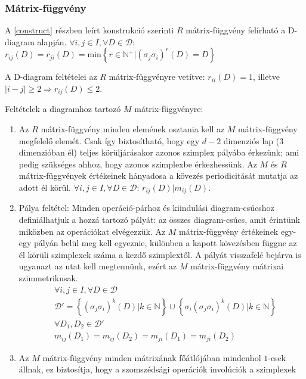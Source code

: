 \documentclass[12pt,magyar,a4paper]{article}
\begin{document}
\subsubsection{Mátrix-függvény}
A \ref{construct} részben leírt konstrukció szerinti $R$ mátrix-függvény
felírható a D-diagram alapján. $\forall i,j\in I, \forall D\in \mathcal{D}$:
$r_{ij}(D)=r_{ji}(D)=\mathrm{min}\left\{r\in
\mathbb{N}^+|(\sigma_j\sigma_i)^r(D)=D\right\}$

A D-diagram feltételei az $R$ mátrix-függvényre vetítve: $r_{ii}(D)=1$,
illetve $|i-j|\geq 2 \Rightarrow r_{ij}(D)\leq2$.

Feltételek a diagramhoz tartozó $M$ mátrix-függvényre:
\begin{enumerate}
  \item Az $R$ mátrix-függvény minden elemének osztania kell az $M$
    mátrix-függvény megfelelő elemét. Csak így biztosítható, hogy egy $d-2$
    dimenziós lap ($3$ dimenzióban él) teljes körüljárásakor azonos szimplex
    pályába érkezünk; ami pedig szükséges ahhoz, hogy azonos szimplexbe
    érkezhessünk. Az $M$ és $R$ mátrix-függvények értékeinek hányadosa a kövezés
    periodicitását mutatja az adott él körül. $\forall i,j\in I, \forall D\in
    \mathcal{D}$: $r_{ij}(D)|m_{ij}(D)$.
  \item Pálya feltétel: Minden operáció-párhoz és kiindulási diagram-csúcshoz
    definiálhatjuk a hozzá tartozó pályát: az összes diagram-csúcs, amit
    érintünk miközben az operációkat elvégezzük. Az $M$ mátrix-függvény
    értékeinek egy-egy pályán belül meg kell egyeznie, különben a kapott
    kövezésben függne az él körüli szimplexek száma a kezdő szimplextől. A
    pályát visszafelé bejárva is ugyanazt az utat kell megtennünk, ezért az $M$
    mátrix-függvény mátrixai szimmetrikusak.
    \begin{align*}                                                                             
      &\forall i,j\in I, \forall D\in \mathcal{D} \\
      &\mathcal{D}'=\left\{(\sigma_j\sigma_i)^k(D)|k\in
      \mathbb{N}\right\}\cup\left\{\sigma_i(\sigma_j\sigma_i)^k(D)|k\in
      \mathbb{N}\right\}\\
      &\forall D_1,D_2 \in \mathcal{D}'\\
      &m_{ij}(D_1)=m_{ij}(D_2)=m_{ji}(D_1)=m_{ji}(D_2)
    \end{align*}
  \item Az $M$ mátrix-függvény minden mátrixának főátlójában mindenhol $1$-esek
    állnak, ez biztosítja, hogy a szomszédsági operációk involúciók a szimplexek

\end{enumerate}
\end{document}

